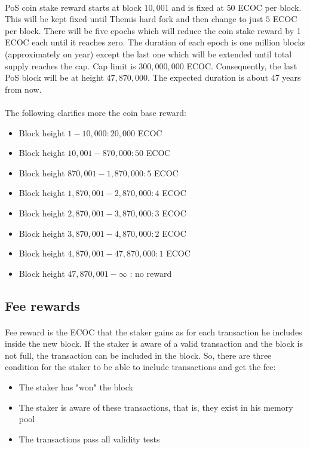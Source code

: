 \documentclass{article}
\begin{document}
\paragraph{}
PoS coin stake reward starts at block $10,001$ and is fixed at $50$ ECOC per block. This will be kept fixed until Themis hard fork and then change to just $5$ ECOC per block. There will be five epochs which will reduce the coin stake reward by 1 ECOC each until it reaches zero. The duration of each epoch is one million blocks (approximately on year) except the last one which will be extended until total supply reaches the cap. Cap limit is $300,000,000$ ECOC. Consequently, the last PoS block will be at height $47,870,000$. The expected duration is about 47 years from now.
\paragraph{}
The following clarifies more the coin base reward:
\begin{itemize}
\item Block height $1-10,000 : 20,000$ ECOC
\item Block height $10,001-870,000 : 50$ ECOC
\item Block height $870,001-1,870,000: 5$ ECOC
\item Block height $1,870,001-2,870,000: 4$ ECOC
\item Block height $2,870,001-3,870,000: 3$ ECOC
\item Block height $3,870,001-4,870,000: 2$ ECOC
\item Block height $4,870,001-47,870,000: 1$ ECOC
\item Block height $47,870,001- \infty$ : no reward
\end{itemize}
 
\subsection{Fee rewards}
\paragraph{}
Fee reward is the ECOC that the staker gains as for each transaction he includes inside the new block. If the staker is aware of a valid transaction and the block is not full, the transaction can be included in the block. So, there are three condition for the staker to be able to include transactions and get the fee:
\begin{itemize}
\item The staker has "won" the block
\item The staker is aware of these transactions, that is, they exist in his memory pool
\item The transactions pass all validity tests
\end{itemize}
\end{document}
